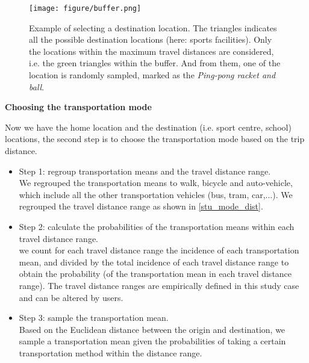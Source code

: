 \documentclass[]{article}
\begin{document}
\begin{figure}[!h]
    \centering
    \texttt{[image: figure/buffer.png]}
    \caption{Example of selecting a destination location. The triangles indicates all the possible destination locations (here: sports facilities). Only the locations within the maximum travel distances are considered, i.e. the green triangles within the buffer. And from them, one of the location is randomly sampled, marked as the \textit{Ping-pong racket and ball}. }
    \label{buffer}
\end{figure} 



\textbf{Choosing the transportation mode}

Now we have the home location and the destination (i.e. sport centre, school) locations, the second step is to choose the transportation mode based on the trip distance. 

\begin{itemize}
    \item Step 1: regroup transportation means and the travel distance range. \\ We regrouped the transportation means to walk, bicycle and auto-vehicle, which include all the other transportation vehicles (bus, tram, car,...). We regrouped the travel distance range as shown in \cref{stu_mode_dist}. 
    
    \item Step 2: calculate the probabilities of the transportation means within each travel distance range. \\ we count for each travel distance range the incidence of each transportation mean, and divided by the total incidence of each travel distance range to obtain the probability (of the transportation mean in each travel distance range). The travel distance ranges are empirically defined in this study case and can be altered by users. 
    
    \item Step 3: sample the transportation mean. \\ 
    Based on the %
    Euclidean distance between the origin and destination, we sample a transportation mean given the probabilities of taking a certain transportation method within the distance range.   
    
\end{itemize}
\end{document}
